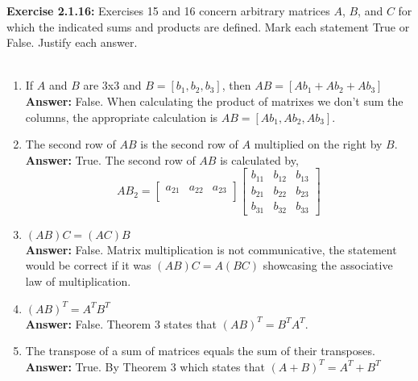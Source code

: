\documentclass{amsart}
\begin{document}
\noindent\textbf{Exercise 2.1.16: } Exercises 15 and 16 concern arbitrary matrices $A$, $B$, and $C$ for which the indicated sums and products are defined. Mark each statement True or False. Justify each answer.\\\\
\begin{enumerate}

\item If $A$ and $B$ are 3x3  and $B = [b_1,b_2,b_3]$, then $AB = [Ab_1+Ab_2+Ab_3]$\\
\textbf{Answer: }False. When calculating the product of matrixes we don't sum the columns, the appropriate calculation is $AB = [Ab_1, Ab_2 ,Ab_3]$.
\vspace{1in}



\item The second row of $AB$ is the second row of $A$ multiplied on the right by $B.$\\
\textbf{Answer: }True. The second row of $AB$ is calculated by,
\begin{equation}
AB_2 =
\begin{bmatrix}
a_{21}&a_{22}&a_{23}\\
\end{bmatrix}
\begin{bmatrix}
b_{11}&b_{12}&b_{13}\\
b_{21}&b_{22}&b_{23}\\
b_{31}&b_{32}&b_{33}
\end{bmatrix}
\end{equation}
\vspace{1in}



\item $(AB)C=(AC)B$\\
\textbf{Answer: } False. Matrix multiplication is not communicative, the statement would be correct if it was $(AB)C=A(BC)$ showcasing the associative law of multiplication.
\vspace{1in}




\item$(AB)^{T}=A^{T}B^{T}$\\
\textbf{Answer: } False. Theorem 3 states that $(AB)^{T}=B^{T}A^{T}$.
\vspace{1in}




\item The transpose of a sum of matrices equals the sum of their transposes.\\
\textbf{Answer: }True. By Theorem 3 which states that  $(A+B)^{T}=A^{T}+B^{T}$
\vspace{1in}





\end{enumerate}
\end{document}
